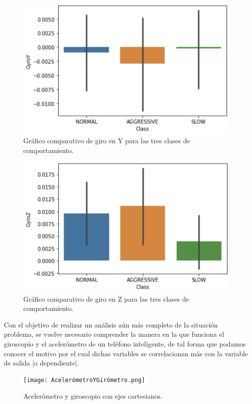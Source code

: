 \documentclass[spanish,12pt,letterpaper]{article}
\begin{document}
    \begin{figure}[htb]
        \centering
        \includegraphics[width=1\columnwidth]{GyroY.png}
        \caption{Gráfico comparativo de giro en Y para las tres clases de comportamiento.}
        \label{fig:comand}%
    \end{figure}

    \begin{figure}[htb]
        \centering
        \includegraphics[width=1\columnwidth]{GyroZ.png}
        \caption{Gráfico comparativo de giro en Z para las tres clases de comportamiento.}
        \label{fig:comand}%
    \end{figure}

\textsc Con el objetivo de realizar un análisis aún más completo de la situación problema, se vuelve necesario comprender la manera en la que funciona el giroscopio y el acelerómetro de un teléfono inteligente, de tal forma que podamos conocer el motivo por el cual dichas variables se correlacionan más con la variable de salida |o dependiente|. \\

    \begin{figure}[htb]
        \centering
        \texttt{[image: AcelerómetroYGirómetro.png]}
        \caption{Acelerómetro y giroscopio con ejes cartesianos.}
        \label{fig:comand}%
    \end{figure}
\end{document}
